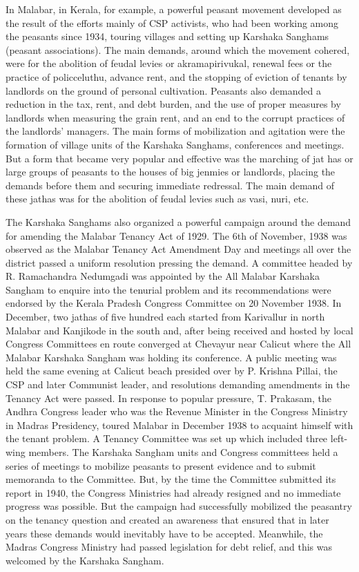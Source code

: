 \begin{multicols}{2}
In Malabar, in Kerala, for example, a powerful peasant movement developed as the result of the efforts mainly of CSP activists, who had been working among the peasants since 1934, touring villages and setting up Karshaka Sanghams (peasant associations). The main demands, around which the movement cohered, were for the abolition of feudal levies or akramapirivukal, renewal fees or the practice of policceluthu, advance rent, and the stopping of eviction of tenants by landlords on the ground of personal cultivation. Peasants also demanded a reduction in the tax, rent, and debt burden, and the use of proper measures by landlords when measuring the grain rent, and an end to the corrupt practices of the landlords' managers. The main forms of mobilization and agitation were the formation of village units of the Karshaka Sanghams, conferences and meetings. But a form that became very popular and effective was the marching of jat has or large groups of peasants to the houses of big jenmies or landlords, placing the demands before them and securing immediate redressal. The main demand of these jathas was for the abolition of feudal levies such as vasi, nuri, etc.

The Karshaka Sanghams also organized a powerful campaign around the demand for amending the Malabar Tenancy Act of 1929. The 6th of November, 1938 was observed as the Malabar Tenancy Act Amendment Day and meetings all over the district passed a uniform resolution pressing the demand. A committee headed by R. Ramachandra Nedumgadi was appointed by the All Malabar Karshaka Sangham to enquire into the tenurial problem and its recommendations were endorsed by the Kerala Pradesh Congress Committee on 20 November 1938. In December, two jathas of five hundred each started from Karivallur in north Malabar and Kanjikode in the south and, after being received and hosted by local Congress Committees en route converged at Chevayur near Calicut where the All Malabar Karshaka Sangham was holding its conference. A public meeting was held the same evening at Calicut beach presided over by P. Krishna Pillai, the CSP and later Communist leader, and resolutions demanding amendments in the Tenancy Act were passed. In response to popular pressure, T. Prakasam, the Andhra Congress leader who was the Revenue Minister in the Congress Ministry in Madras Presidency, toured Malabar in December 1938 to acquaint himself with the tenant problem. A Tenancy Committee was set up which included three left-wing members. The Karshaka Sangham units and Congress committees held a series of meetings to mobilize peasants to present evidence and to submit memoranda to the Committee. But, by the time the Committee submitted its report in 1940, the Congress Ministries had already resigned and no immediate progress was possible. But the campaign had successfully mobilized the peasantry on the tenancy question and created an awareness that ensured that in later years these demands would inevitably have to be accepted. Meanwhile, the Madras Congress Ministry had passed legislation for debt relief, and this was welcomed by the Karshaka Sangham.


\end{multicols}

